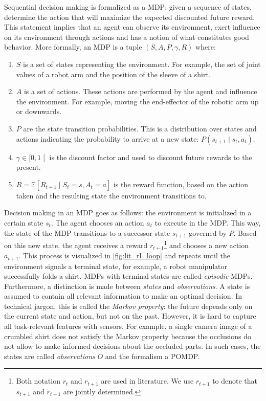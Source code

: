 \documentclass[\home/main.tex]{subfiles}
\begin{document}
Sequential decision making is formalized as a \gls{MDP}: given a sequence of states, determine the action that will maximize the expected discounted future reward. This statement implies that an agent can observe its environment, exert influence on its environment through actions and has a notion of what constitutes good behavior. More formally, an \gls{MDP} is a tuple $\left(S, A,P, \gamma, R\right)$ where:
\begin{enumerate}
	\item $S$ is a set of states representing the environment. For example, the set of joint values of a robot arm and the position of the sleeve of a shirt.
	\item $A$ is a set of actions. These actions are performed by the agent and influence the environment. For example, moving the end-effector of the robotic arm up or downwards.
	\item $P$ are the state transition probabilities. This is a distribution over states and actions indicating the probability to arrive at a new state: $P\left(s_{t+1} \mid s_{t}, a_{t}\right)$.
	\item $\gamma \in \mathopen[0, 1\mathclose[$ is the discount factor and used to discount future rewards to the present.
	\item $R = \mathbb{E}[R_{t+1} \mid S_t=s, A_t=a]$ is the reward function, based on the action taken and the resulting state the environment transitions to.
\end{enumerate}
Decision making in an MDP goes as follows: the environment is initialized in a certain state $s_t$. The agent chooses an action $a_t$ to execute in the MDP. This way, the state of the MDP transitions to a successor state $s_{t+1}$ governed by $P$. Based on this new state, the agent receives a reward $r_{t+1}$\footnote{Both notation $r_{t}$ and $r_{t+1}$ are used in literature. We use $r_{t+1}$ to denote that $s_{t+1}$ and $r_{t+1}$ are jointly determined.} and chooses a new action $a_{t+1}$. This process is visualized in \cref{fig:lit_rl_loop} and repeats until the environment signals a terminal state, for example, a robot manipulator successfully folds a shirt. \Glspl{MDP} with terminal states are called \emph{episodic} \glspl{MDP}. Furthermore, a distinction is made between \emph{states} and \emph{observations}. A state is assumed to contain all relevant information to make an optimal decision. In technical jargon, this is called the \emph{Markov property}: the future depends only on the current state and action, but not on the past. However, it is hard to capture all task-relevant features with sensors. For example, a single camera image of a crumbled shirt does not satisfy the Markov property because the occlusions do not allow to make informed decisions about the occluded parts. In such cases, the states are called \emph{observations} $O$ and the formalism a \gls{POMDP}.
\end{document}
